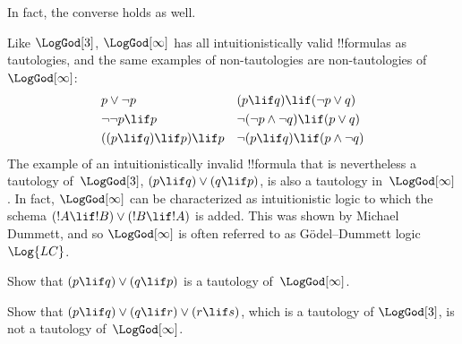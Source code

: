 \documentclass[../../../include/open-logic-section]{subfiles}
\begin{document}
In fact, the converse holds as well.

Like $\LogGod[3]$, $\LogGod[\infty]$ has all intuitionistically valid
!!{formula}s as tautologies, and the same examples of non-tautologies
are non-tautologies of~$\LogGod[\infty]$:
\begin{align*}
  & p \lor \lnot p && (p \lif q) \lif (\lnot p \lor q) \\
  & \lnot\lnot p \lif p && \lnot(\lnot p \land \lnot q) \lif (p \lor q) \\
  & ((p \lif q) \lif p) \lif p && \lnot(p \lif q) \lif (p \land \lnot q)
\end{align*}
The example of an intuitionistically invalid !!{formula} that is
nevertheless a tautology of~$\LogGod[3]$, $(p \lif q) \lor (q \lif
p)$, is also a tautology in~$\LogGod[\infty]$. In fact,
$\LogGod[\infty]$ can be characterized as intuitionistic logic to
which the schema $(!A \lif !B) \lor (!B \lif !A)$ is added. This was
shown by Michael Dummett, and so $\LogGod[\infty]$ is often referred to
as G\"odel--Dummett logic~$\Log{LC}$.

\begin{prob}
  Show that $(p \lif q) \lor (q \lif p)$ is a
  tautology of~$\LogGod[\infty]$.
\end{prob}

\begin{prob}
  Show that $(p \lif q) \lor (q \lif r) \lor (r \lif s)$, which is 
  a tautology of $\LogGod[3]$, is not a tautology of~$\LogGod[\infty]$.
\end{prob}
\end{document}

